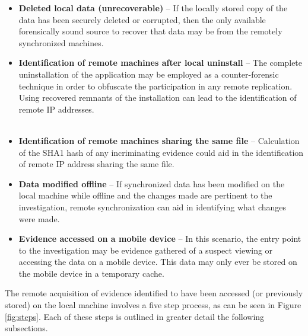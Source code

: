\documentclass{jdfsl}
\begin{document}
\begin{itemize}
\item \textbf{Deleted local data (unrecoverable)} -- If the locally stored copy of the data has been securely deleted or corrupted, then the only available forensically sound source to recover that data may be from the remotely synchronized machines.
\item \textbf{Identification of remote machines after local uninstall} -- The complete uninstallation of the application may be employed as a counter-forensic technique in order to obfuscate the participation in any remote replication. Using recovered remnants of the installation can lead to the identification of remote IP addresses.\\\\
\item \textbf{Identification of remote machines sharing the same file} -- Calculation of the SHA1 hash of any incriminating evidence could aid in the identification of remote IP address sharing the same file.
\item \textbf{Data modified offline} -- If synchronized data has been modified on the local machine while offline and the changes made are pertinent to the investigation, remote synchronization can aid in identifying what changes were made.
\item \textbf{Evidence accessed on a mobile device} -- In this scenario, the entry point to the investigation may be evidence gathered of a suspect viewing or accessing the data on a mobile device. This data may only ever be stored on the mobile device in a temporary cache.
\end{itemize}



The remote acquisition of evidence identified to have been accessed (or previously stored) on the local machine involves a five step process, as can be seen in Figure \ref{fig:steps}. Each of these steps is outlined in greater detail the following subsections.\\
\end{document}
